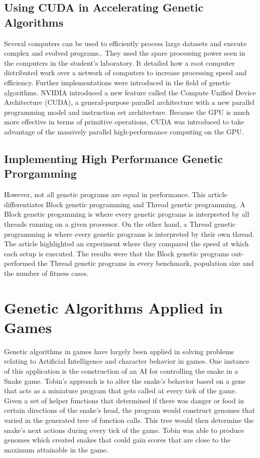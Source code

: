 \subsection{Using CUDA in Accelerating Genetic Algorithms}
Several computers can be used to efficiently process large datasets and execute complex
and evolved programs.\cite{Harding09}. They used the spare processing power seen in the
computers in the student's laboratory. It detailed how a root computer distributed work
over a network of computers to increase processing speed and efficiency. Further
implementations were introduced in the field of genetic algorithms. NVIDIA introduced a new feature called the Compute Unified Device Architecture (CUDA),
a general-purpose parallel architecture with a new parallel programming model and instruction
set architecture\cite{Zhang09}.  Because the GPU is much more effective in terms of primitive
operations, CUDA was introduced to take advantage of the massively parallel high-performance
computing on the GPU.  

\subsection{Implementing High Performance Genetic Prorgamming}
However, not all genetic programs are equal in performance. This article  differentiates
Block genetic programming and Thread genetic programming\cite{Robbilliard09}. A Block
genetic progamming is where every genetic programs is interpreted by all threads running
on a given processor. On the other hand, a Thread genetic programming is where every genetic
programs is interpreted by their own thread. The article highlighted an experiment where they
compared the speed at which each setup is executed. The results were that the Block genetic
programs out-performed the Thread genetic programs in every benchmark, population size and
the number of fitness cases.

\section{Genetic Algorithms Applied in Games}
Genetic algorithms in games have largely been applied in solving problems relating to
Artificial Intelligence and character behavior in games. One instance of this application
is the construction of an AI for controlling the snake in a Snake game\cite{Ehlis00}.
Tobin's approach is to alter the snake's behavior based on a gene that acts as a miniature
program that gets called at every tick of the game. Given a set of helper functions that
determined if there was danger or food in certain directions of the snake's head, the
program would construct genomes that varied in the generated tree of function calls. This
tree would then determine the snake's next actions during every tick of the game. Tobin
was able to produce genomes which created snakes that could gain scores that are close to
the maximum attainable in the game.  

